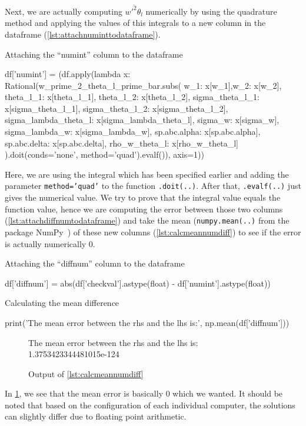 Next, we are actually computing $\overline{w'^2\theta_l}$ numerically by using the quadrature method 
and applying the values of this integrals 
to a new column in the dataframe (\cref{lst:attachnuminttodataframe}).
\begin{listing}[!ht]
    \caption{Attaching the \enquote{numint} column to the dataframe}
    \label{lst:attachnuminttodataframe}
    \begin{pythoncode}
        df['numint'] = (df.apply(lambda x: Rational(w_prime_2_theta_l_prime_bar.subs({
            w_1: x[w_1],w_2: x[w_2], theta_l_1: x[theta_l_1], theta_l_2: x[theta_l_2],
            sigma_theta_l_1: x[sigma_theta_l_1], sigma_theta_l_2: x[sigma_theta_l_2],
            sigma_lambda_theta_l: x[sigma_lambda_theta_l], sigma_w: x[sigma_w],
            sigma_lambda_w: x[sigma_lambda_w], sp.abc.alpha: x[sp.abc.alpha],
            sp.abc.delta: x[sp.abc.delta], rho_w_theta_l: x[rho_w_theta_l]
        }).doit(conds='none', method='quad').evalf()), axis=1))
    \end{pythoncode}
\end{listing}
Here, we are using the integral which has been specified earlier 
and adding the parameter \texttt{method='quad'} 
to the function \texttt{.doit(..)}.
After that, \texttt{.evalf(..)} just gives the numerical value.
We try to prove that the integral value equals the function value, 
hence we are computing the error between those two columns (\cref{lst:attachdiffnumtodataframe})
and take the mean (\texttt{numpy.mean(..)} from the package NumPy~\autocite{harris2020array})
of these new columns (\cref{lst:calcmeannumdiff}) to see if the error is actually numerically 0.
\begin{listing}[!ht]
    \caption{Attaching the \enquote{diffnum} column to the dataframe}
    \label{lst:attachdiffnumtodataframe}
    \begin{pythoncode}
        df['diffnum'] = abs(df['checkval'].astype(float) - df['numint'].astype(float))
    \end{pythoncode}
\end{listing}
\begin{listing}[!ht]
    \caption{Calculating the mean difference}
    \label{lst:calcmeannumdiff}
    \begin{pythoncode}
        print('The mean error between the rhs and the lhs is:', np.mean(df['diffnum']))
    \end{pythoncode}
\end{listing}
\begin{figure}[!ht]
    \centering
    \caption{Output of \cref{lst:calcmeannumdiff}}
    \label{fig:calcmeannumdiffout}
    The mean error between the rhs and the lhs is: 1.3753423344481015e-124
\end{figure}

In \cref{fig:calcmeannumdiffout}, we see that the mean error is basically 0 which we wanted.
It should be noted that based on the configuration of each individual computer,
the solutions can slightly differ due to floating point arithmetic.